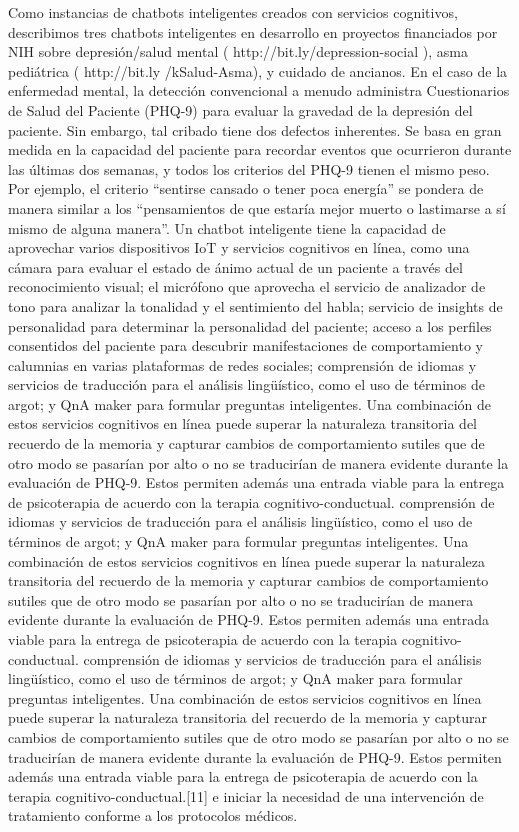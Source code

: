 Como instancias de chatbots inteligentes creados con servicios cognitivos, describimos tres chatbots inteligentes en desarrollo en proyectos financiados por NIH sobre depresión/salud mental ( http://bit.ly/depression-social ), asma pediátrica ( http://bit.ly /kSalud-Asma), y cuidado de ancianos. En el caso de la enfermedad mental, la detección convencional a menudo administra Cuestionarios de Salud del Paciente (PHQ-9) para evaluar la gravedad de la depresión del paciente. Sin embargo, tal cribado tiene dos defectos inherentes. Se basa en gran medida en la capacidad del paciente para recordar eventos que ocurrieron durante las últimas dos semanas, y todos los criterios del PHQ-9 tienen el mismo peso. Por ejemplo, el criterio “sentirse cansado o tener poca energía” se pondera de manera similar a los “pensamientos de que estaría mejor muerto o lastimarse a sí mismo de alguna manera”. Un chatbot inteligente tiene la capacidad de aprovechar varios dispositivos IoT y servicios cognitivos en línea, como una cámara para evaluar el estado de ánimo actual de un paciente a través del reconocimiento visual; el micrófono que aprovecha el servicio de analizador de tono para analizar la tonalidad y el sentimiento del habla; servicio de insights de personalidad para determinar la personalidad del paciente; acceso a los perfiles consentidos del paciente para descubrir manifestaciones de comportamiento y calumnias en varias plataformas de redes sociales; comprensión de idiomas y servicios de traducción para el análisis lingüístico, como el uso de términos de argot; y QnA maker para formular preguntas inteligentes. Una combinación de estos servicios cognitivos en línea puede superar la naturaleza transitoria del recuerdo de la memoria y capturar cambios de comportamiento sutiles que de otro modo se pasarían por alto o no se traducirían de manera evidente durante la evaluación de PHQ-9. Estos permiten además una entrada viable para la entrega de psicoterapia de acuerdo con la terapia cognitivo-conductual. comprensión de idiomas y servicios de traducción para el análisis lingüístico, como el uso de términos de argot; y QnA maker para formular preguntas inteligentes. Una combinación de estos servicios cognitivos en línea puede superar la naturaleza transitoria del recuerdo de la memoria y capturar cambios de comportamiento sutiles que de otro modo se pasarían por alto o no se traducirían de manera evidente durante la evaluación de PHQ-9. Estos permiten además una entrada viable para la entrega de psicoterapia de acuerdo con la terapia cognitivo-conductual. comprensión de idiomas y servicios de traducción para el análisis lingüístico, como el uso de términos de argot; y QnA maker para formular preguntas inteligentes. Una combinación de estos servicios cognitivos en línea puede superar la naturaleza transitoria del recuerdo de la memoria y capturar cambios de comportamiento sutiles que de otro modo se pasarían por alto o no se traducirían de manera evidente durante la evaluación de PHQ-9. Estos permiten además una entrada viable para la entrega de psicoterapia de acuerdo con la terapia cognitivo-conductual.[11] e iniciar la necesidad de una intervención de tratamiento conforme a los protocolos médicos.

